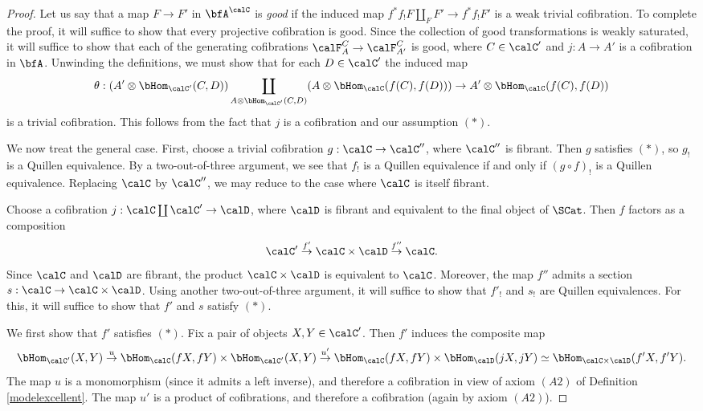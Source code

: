 \begin{Simplicial Categories}
\begin{proof}
Let us say that a map $F \rightarrow F'$ in $\bfA^{\calC}$ is {\it good} if the
induced map $f^{\ast} f_{!} F \coprod_{F} F' \rightarrow f^{\ast} f_{!} F'$
is a weak trivial cofibration. To complete the proof, it will suffice to show that
every projective cofibration is good. Since the collection of good transformations
is weakly saturated, it will suffice to show that each of the generating cofibrations
$\calF^{C}_{A} \rightarrow \calF^{C}_{A'}$ is good, where $C \in \calC'$ and
$j: A \rightarrow A'$ is a cofibration in $\bfA$. Unwinding the definitions, we must show that
for each $D \in \calC'$ the induced map
$$ \theta: (A' \otimes \bHom_{\calC'}(C, D)) \coprod_{ A \otimes \bHom_{\calC'}(C,D)}
(A \otimes \bHom_{\calC}(f(C), f(D))) \rightarrow A' \otimes \bHom_{\calC}( f(C), f(D) )$$
is a trivial cofibration. This follows from the fact that $j$ is a cofibration and our assumption $(\ast)$.

We now treat the general case. First, choose a trivial cofibration $g: \calC \rightarrow \calC''$, where
$\calC''$ is fibrant. Then $g$ satisfies $(\ast)$, so $g_!$ is a Quillen equivalence.
By a two-out-of-three argument, we see that $f_!$ is a Quillen equivalence if and only if
$(g \circ f)_!$ is a Quillen equivalence. Replacing $\calC$ by $\calC''$, we may
reduce to the case where $\calC$ is itself fibrant.

Choose a cofibration $j: \calC \coprod \calC' \rightarrow \calD$, where
$\calD$ is fibrant and equivalent to the final object of $\SCat$. Then $f$ factors as a composition
$$ \calC' \stackrel{f'}{\rightarrow} \calC \times \calD \stackrel{f''}{\rightarrow} \calC.$$
Since $\calC$ and $\calD$ are fibrant, the product $\calC \times \calD$ is equivalent
to $\calC$. Moreover, the map $f''$ admits a section $s: \calC \rightarrow \calC \times \calD$.
Using another two-out-of-three argument, it will suffice to show that $f'_{!}$ and $s_!$ are Quillen equivalences. For this, it will suffice to show that $f'$ and $s$ satisfy $(\ast)$.

We first show that $f'$ satisfies $(\ast)$. Fix a pair of objects $X,Y \in \calC'$.
Then $f'$ induces the composite map
$$ \bHom_{\calC'}(X,Y) \stackrel{u}{\rightarrow} \bHom_{\calC}(fX,fY) \times \bHom_{\calC'}(X,Y)
\stackrel{u'}{\rightarrow} \bHom_{\calC}(fX,fY) \times \bHom_{\calD}(jX,jY) \simeq \bHom_{\calC \times \calD}(f'X, f'Y).$$
The map $u$ is a monomorphism (since it admits a left inverse), and therefore a cofibration
in view of axiom $(A2)$ of Definition \ref{modelexcellent}. 
The map $u'$ is a product of cofibrations, and therefore a cofibration (again by axiom $(A2)$).


\end{proof}
\end{Simplicial Categories}
